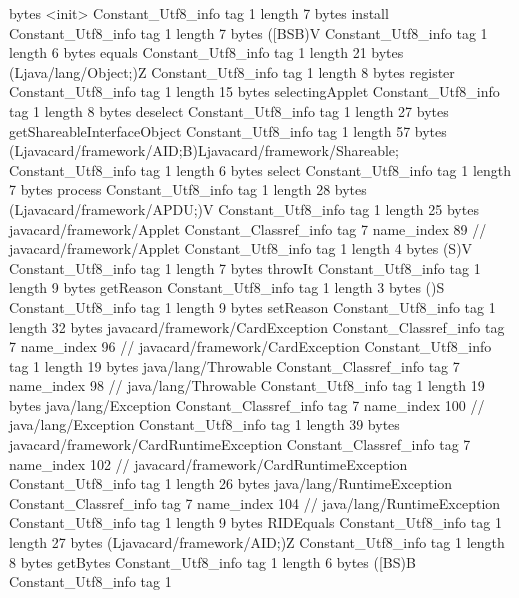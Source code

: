 {{{			bytes	<init>
		}
		Constant_Utf8_info {
			tag	1
			length	7
			bytes	install
		}
		Constant_Utf8_info {
			tag	1
			length	7
			bytes	([BSB)V
		}
		Constant_Utf8_info {
			tag	1
			length	6
			bytes	equals
		}
		Constant_Utf8_info {
			tag	1
			length	21
			bytes	(Ljava/lang/Object;)Z
		}
		Constant_Utf8_info {
			tag	1
			length	8
			bytes	register
		}
		Constant_Utf8_info {
			tag	1
			length	15
			bytes	selectingApplet
		}
		Constant_Utf8_info {
			tag	1
			length	8
			bytes	deselect
		}
		Constant_Utf8_info {
			tag	1
			length	27
			bytes	getShareableInterfaceObject
		}
		Constant_Utf8_info {
			tag	1
			length	57
			bytes	(Ljavacard/framework/AID;B)Ljavacard/framework/Shareable;
		}
		Constant_Utf8_info {
			tag	1
			length	6
			bytes	select
		}
		Constant_Utf8_info {
			tag	1
			length	7
			bytes	process
		}
		Constant_Utf8_info {
			tag	1
			length	28
			bytes	(Ljavacard/framework/APDU;)V
		}
		Constant_Utf8_info {
			tag	1
			length	25
			bytes	javacard/framework/Applet
		}
		Constant_Classref_info {
			tag	7
			name_index	89		// javacard/framework/Applet
		}
		Constant_Utf8_info {
			tag	1
			length	4
			bytes	(S)V
		}
		Constant_Utf8_info {
			tag	1
			length	7
			bytes	throwIt
		}
		Constant_Utf8_info {
			tag	1
			length	9
			bytes	getReason
		}
		Constant_Utf8_info {
			tag	1
			length	3
			bytes	()S
		}
		Constant_Utf8_info {
			tag	1
			length	9
			bytes	setReason
		}
		Constant_Utf8_info {
			tag	1
			length	32
			bytes	javacard/framework/CardException
		}
		Constant_Classref_info {
			tag	7
			name_index	96		// javacard/framework/CardException
		}
		Constant_Utf8_info {
			tag	1
			length	19
			bytes	java/lang/Throwable
		}
		Constant_Classref_info {
			tag	7
			name_index	98		// java/lang/Throwable
		}
		Constant_Utf8_info {
			tag	1
			length	19
			bytes	java/lang/Exception
		}
		Constant_Classref_info {
			tag	7
			name_index	100		// java/lang/Exception
		}
		Constant_Utf8_info {
			tag	1
			length	39
			bytes	javacard/framework/CardRuntimeException
		}
		Constant_Classref_info {
			tag	7
			name_index	102		// javacard/framework/CardRuntimeException
		}
		Constant_Utf8_info {
			tag	1
			length	26
			bytes	java/lang/RuntimeException
		}
		Constant_Classref_info {
			tag	7
			name_index	104		// java/lang/RuntimeException
		}
		Constant_Utf8_info {
			tag	1
			length	9
			bytes	RIDEquals
		}
		Constant_Utf8_info {
			tag	1
			length	27
			bytes	(Ljavacard/framework/AID;)Z
		}
		Constant_Utf8_info {
			tag	1
			length	8
			bytes	getBytes
		}
		Constant_Utf8_info {
			tag	1
			length	6
			bytes	([BS)B
		}
		Constant_Utf8_info {
			tag	1
}}}
